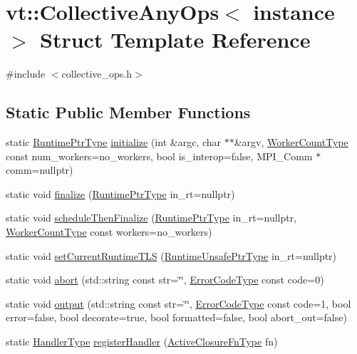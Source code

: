 \hypertarget{structvt_1_1_collective_any_ops}{}\section{vt\+:\+:Collective\+Any\+Ops$<$ instance $>$ Struct Template Reference}
\label{structvt_1_1_collective_any_ops}


{\ttfamily \#include $<$collective\+\_\+ops.\+h$>$}

\subsection*{Static Public Member Functions}
\begin{DoxyCompactItemize}
\item 
static \hyperlink{namespacevt_a0ce60e0299d8fa32223b3b9ffa0af466}{Runtime\+Ptr\+Type} \hyperlink{structvt_1_1_collective_any_ops_afbf0247b03bc917bb8dbf56142eb698e}{initialize} (int \&argc, char $\ast$$\ast$\&argv, \hyperlink{namespacevt_aa93398ea48f2cb6c188512250f7cc248}{Worker\+Count\+Type} const num\+\_\+workers=no\+\_\+workers, bool is\+\_\+interop=false, M\+P\+I\+\_\+\+Comm $\ast$comm=nullptr)
\item 
static void \hyperlink{structvt_1_1_collective_any_ops_ae2260154e455458fc26f02f0bce6702d}{finalize} (\hyperlink{namespacevt_a0ce60e0299d8fa32223b3b9ffa0af466}{Runtime\+Ptr\+Type} in\+\_\+rt=nullptr)
\item 
static void \hyperlink{structvt_1_1_collective_any_ops_a10be760566e5c50ce6d35ab93d7736ce}{schedule\+Then\+Finalize} (\hyperlink{namespacevt_a0ce60e0299d8fa32223b3b9ffa0af466}{Runtime\+Ptr\+Type} in\+\_\+rt=nullptr, \hyperlink{namespacevt_aa93398ea48f2cb6c188512250f7cc248}{Worker\+Count\+Type} const workers=no\+\_\+workers)
\item 
static void \hyperlink{structvt_1_1_collective_any_ops_aa86dfdc9c8ac6f25033948b5dd26fb5b}{set\+Current\+Runtime\+T\+LS} (\hyperlink{namespacevt_a8019b70cc4b9b0833c38559c85dfd53b}{Runtime\+Unsafe\+Ptr\+Type} in\+\_\+rt=nullptr)
\item 
static void \hyperlink{structvt_1_1_collective_any_ops_a31a089ab739c612171e581ead8922e8b}{abort} (std\+::string const str=\char`\"{}\char`\"{}, \hyperlink{namespacevt_a793764d753923abc3d32929870beb485}{Error\+Code\+Type} const code=0)
\item 
static void \hyperlink{structvt_1_1_collective_any_ops_a5ae4676659166ab1e1ac7334776d58c3}{output} (std\+::string const str=\char`\"{}\char`\"{}, \hyperlink{namespacevt_a793764d753923abc3d32929870beb485}{Error\+Code\+Type} const code=1, bool error=false, bool decorate=true, bool formatted=false, bool abort\+\_\+out=false)
\item 
static \hyperlink{namespacevt_af64846b57dfcaf104da3ef6967917573}{Handler\+Type} \hyperlink{structvt_1_1_collective_any_ops_a7e8425c141657c1b8286c5b56c5fd43d}{register\+Handler} (\hyperlink{namespacevt_a2a06c34cafcd511828f16cbf1476b924}{Active\+Closure\+Fn\+Type} fn)
\end{DoxyCompactItemize}


